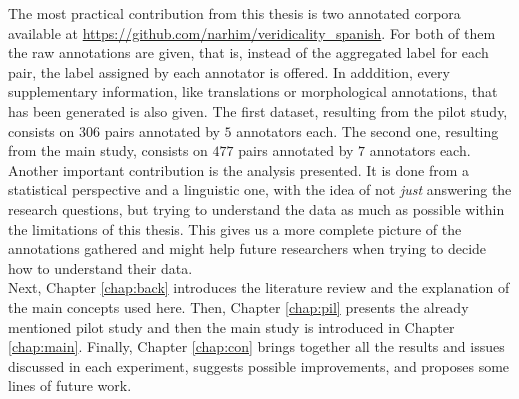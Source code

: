 The most practical contribution from this thesis is two annotated corpora available at \url{https://github.com/narhim/veridicality_spanish}. For both of them the raw annotations are given, that is, instead of the aggregated label for each pair, the label assigned by each annotator is offered. In adddition, every supplementary information, like translations or morphological annotations, that has been generated is also given. The first dataset, resulting from the pilot study, consists on $306$ pairs annotated by $5$ annotators each. The second one, resulting from the main study, consists on $477$ pairs annotated by $7$ annotators each.\\

Another important contribution is the analysis presented. It is done from a statistical perspective and a linguistic one, with the idea of not \textit{just} answering the research questions, but trying to understand the data as much as possible within the limitations of this thesis. This gives us a more complete picture of the annotations gathered and might help future researchers when trying to decide how to understand their data.\\ 

Next, Chapter \ref{chap:back} introduces the literature review and the explanation of the main concepts used here. Then, Chapter \ref{chap:pil} presents the already mentioned pilot study and then the main study is introduced in Chapter \ref{chap:main}. Finally, Chapter \ref{chap:con} brings together all the results and issues discussed in each experiment, suggests possible improvements, and proposes some lines of future work.\\
